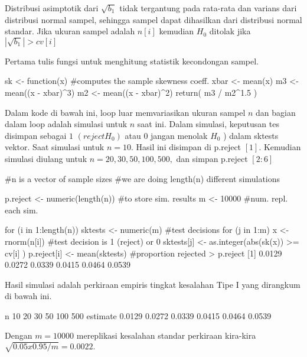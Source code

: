 \documentclass[a4paper,12pt]{article}
\theoremstyle{definition}
\begin{document}
Distribusi asimptotik dari $\sqrt{b_{1}}$ tidak tergantung pada rata-rata dan varians dari distribusi normal sampel, sehingga sampel dapat dihasilkan
dari distribusi normal standar. Jika ukuran sampel adalah $n[i]$ kemudian ${H_{0}}$ ditolak jika $\left | \sqrt{b_{1}} \right | > cv \left [ i \right ]$

Pertama tulis fungsi untuk menghitung statistik kecondongan sampel.

\begin{spverbatim}
    sk <- function(x) {
        #computes the sample skewness coeff.
        xbar <- mean(x)
        m3 <- mean((x - xbar)^3)
        m2 <- mean((x - xbar)^2)
        return( m3 / m2^1.5 )
     }
\end{spverbatim}

Dalam kode di bawah ini, loop luar memvariasikan ukuran sampel $n$ dan bagian dalam loop adalah simulasi untuk $n$ saat ini. Dalam simulasi, keputusan tes disimpan sebagai $1$ $( reject {H_{0}} )$ atau $0$ jangan menolak $ {H_{0}}$ ) dalam sktests vektor. Saat simulasi untuk $n = 10.$   Hasil ini disimpan di p.reject $[1]$. Kemudian simulasi diulang untuk $n = 20, 30, 50, 100, 500,$ dan simpan p.reject $[2:6]$

\begin{spverbatim}
    #n is a vector of sample sizes
    #we are doing length(n) different simulations
    
    p.reject <- numeric(length(n)) #to store sim. results
    m <- 10000 #num. repl. each sim.
    
    for (i in 1:length(n)) {
        sktests <- numeric(m) #test decisions
        for (j in 1:m) {
            x <- rnorm(n[i])
            #test decision is 1 (reject) or 0
            sktests[j] <- as.integer(abs(sk(x)) >= cv[i] )
            }
        p.reject[i] <- mean(sktests) #proportion rejected
}
> p.reject
[1] 0.0129 0.0272 0.0339 0.0415 0.0464 0.0539
\end{spverbatim}

Hasil simulasi adalah perkiraan empiris tingkat kesalahan Tipe I yang dirangkum di bawah ini. 

\begin{spverbatim}
    n          10     20      30    50     100    500
    estimate 0.0129 0.0272 0.0339 0.0415 0.0464 0.0539
\end{spverbatim}

Dengan $m = 10000$ mereplikasi kesalahan standar perkiraan kira-kira $\sqrt{0.05  x  0.95/m} = 0.0022.$ 
\end{document}
